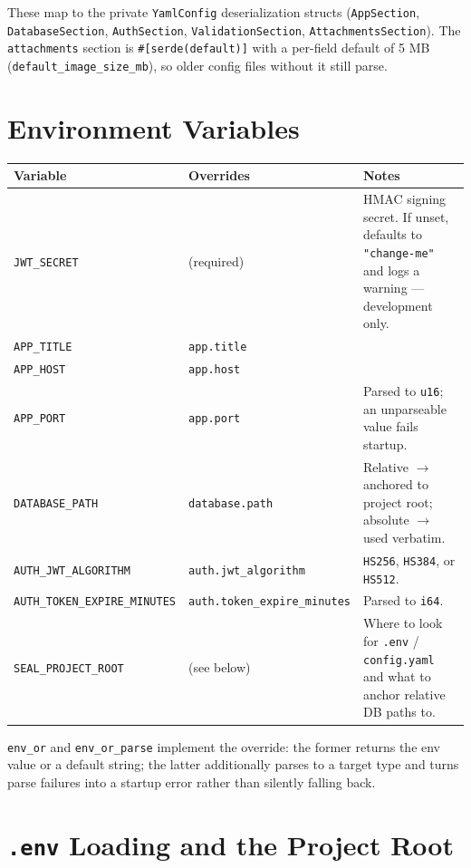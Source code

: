 These map to the private \verb|YamlConfig| deserialization structs
(\verb|AppSection|, \verb|DatabaseSection|, \verb|AuthSection|,
\verb|ValidationSection|, \verb|AttachmentsSection|). The \verb|attachments|
section is \verb|#[serde(default)]| with a per-field default of 5 MB
(\verb|default_image_size_mb|), so older config files without it still parse.

\section{Environment Variables}

\begin{center}
\begin{longtable}{@{}llp{}@{}}
\toprule
\textbf{Variable} & \textbf{Overrides} & \textbf{Notes} \\
\midrule
\endhead
\verb|JWT_SECRET| & (required) & HMAC signing secret. If unset, defaults to \verb|"change-me"| and logs a warning --- development only. \\
\verb|APP_TITLE| & \verb|app.title| & \\
\verb|APP_HOST| & \verb|app.host| & \\
\verb|APP_PORT| & \verb|app.port| & Parsed to \verb|u16|; an unparseable value fails startup. \\
\verb|DATABASE_PATH| & \verb|database.path| & Relative $\to$ anchored to project root; absolute $\to$ used verbatim. \\
\verb|AUTH_JWT_ALGORITHM| & \verb|auth.jwt_algorithm| & \verb|HS256|, \verb|HS384|, or \verb|HS512|. \\
\verb|AUTH_TOKEN_EXPIRE_MINUTES| & \verb|auth.token_expire_minutes| & Parsed to \verb|i64|. \\
\verb|SEAL_PROJECT_ROOT| & (see below) & Where to look for \verb|.env| / \verb|config.yaml| and what to anchor relative DB paths to. \\
\bottomrule
\end{longtable}
\end{center}

\verb|env_or| and \verb|env_or_parse| implement the override: the former returns
the env value or a default string; the latter additionally parses to a target
type and turns parse failures into a startup error rather than silently falling
back.

\section{\texttt{.env} Loading and the Project Root}

